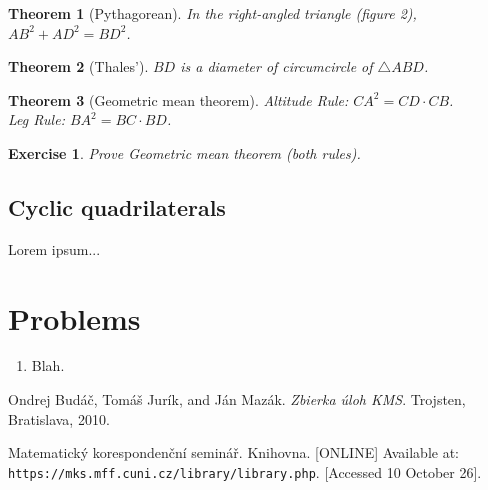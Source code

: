 \documentclass[11pt,a5paper]{article}
\newtheorem{exercise}{Exercise}
\newtheorem*{Theorem}{Theorem}
\begin{document}
\begin{Theorem}[Pythagorean]
	In the right-angled triangle (figure 2), $AB^2 + AD^2 = BD^2$.
\end{Theorem}
\begin{Theorem}[Thales']
	$BD$ is a diameter of circumcircle of $\triangle ABD$.
\end{Theorem}
\begin{Theorem}[Geometric mean theorem]
	Altitude Rule: $CA^2 = CD \cdot CB$.\\
	Leg Rule:  $BA^2 = BC \cdot BD$.
\end{Theorem}
\begin{exercise} Prove \emph{Geometric mean theorem} (both rules).
\end{exercise}

\subsection*{Cyclic quadrilaterals}

Lorem ipsum...

\section{Problems}


\begin{enumerate}
	\subsection*{Easy}
	
	\subsection*{Medium}	
	
	\subsection*{Difficult}

	\subsection*{Extra}	
	\item{Blah.}

\end{enumerate}

\begin{thebibliography}{9}
 Ondrej Budáč, Tomáš Jurík, and Ján Mazák. 
	\emph{Zbierka úloh KMS}. Trojsten, Bratislava, 2010.
	
 Matematický korespondenční seminář. Knihovna. [ONLINE] Available at: \texttt{https://mks.mff.cuni.cz/library/library.php}. [Accessed 10 October 26].
\end{thebibliography}
\end{document}
